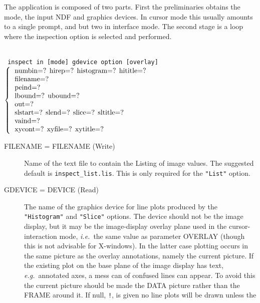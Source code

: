 \documentclass[twoside,11pt]{article}
\newcommand{\htmlref}[2]{#1}
\newcommand{\sstusage}[1]{\pagebreak[3] \item[Usage:] \mbox{} \\[1.3ex] {\ssttt #1}}
\newcommand{\sstparameters}[1]{
   \goodbreak 
   \item[Parameters:] \mbox{} \\
   \vspace{-3.5ex}
   \begin{description}
      #1
   \end{description}
}
\newcommand{\sstsubsection}[1]{ \item[{#1}] \mbox{} \\}
\newcommand{\ssttt}{\tt}
\renewcommand{\sstusage}[1]{\htmlref{\item[Usage:]}{ap:usage} \mbox{} \\ {\ssttt #1}}
\renewcommand{\sstparameters}[1]{
      \htmlref{\item[Parameters:]}{se:param}
      \begin{description}
         #1
      \end{description}
   }
\renewcommand{\sstsubsection}[1]{\item[{#1}]}
\begin{document}
{{      The application is composed of two parts.  First the preliminaries
      obtains the mode, the input NDF and graphics devices.  In cursor
      mode this usually amounts to a single prompt, and but two in
      interface mode.  The second stage is a loop where the inspection
      option is selected and performed.
   }
   \sstusage{
      inspect in [mode] gdevice option [overlay]
        \newline\hspace*{1.5em}
        $\left\{ {\begin{tabular}{l}
                   numbin=? hirep=? histogram=? hititle=? \\
                   filename=? \\
                   peind=? \\
                   lbound=? ubound=? \\
                   out=? \\
                   slstart=? slend=? slice=? sltitle=? \\
                   vaind=? \\
                   xycont=? xyfile=? xytitle=?
                   \end{tabular} }
        \right.$
        \newline\hspace*{1.9em}
        \makebox[0mm][c]{\small option}
   }
   \sstparameters{
      \sstsubsection{
         FILENAME = FILENAME (Write)
      }{
         Name of the text file to contain the Listing of image values.
         The suggested default is {\tt inspect\_list.lis}.  This is only
         required for the {\tt "List"} option.
      }
      \sstsubsection{
         GDEVICE = DEVICE (Read)
      }{
         The name of the graphics device for line plots produced by the
         {\tt "Histogram"} and {\tt "Slice"} options.  The device should
         not be the image display, but it may be the image-display overlay
         plane used in the cursor-interaction mode, {\it i.e.}\ the same
         value as parameter OVERLAY (though this is not advisable for
         X-windows).  In the latter case plotting occurs in the same
         picture as the overlay annotations, namely the current
         picture.  If the existing plot on the base plane of the image
         display has text, {\it e.g.}\ annotated axes, a mess can of confused
         lines can appear.  To avoid this the current picture should be
         made the DATA picture rather than the FRAME around it.  If
         null, {\tt !}, is given no line plots will be drawn unless the
}}}
\end{document}
